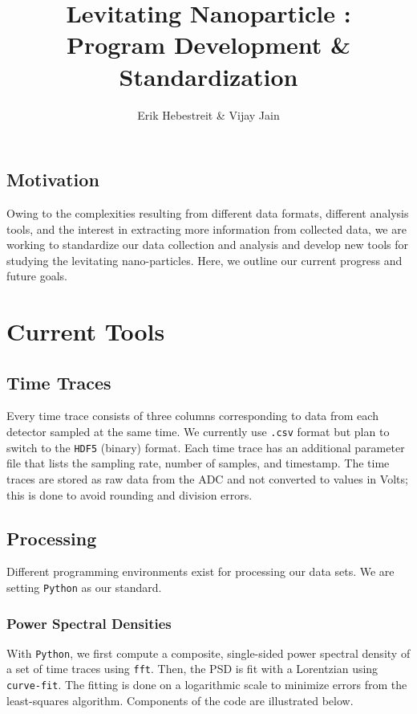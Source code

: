 \documentclass[a4paper,11pt,fleqn,english]{amsart}
\title{Levitating Nanoparticle : \\ Program Development \& Standardization}
\author{Erik Hebestreit \& Vijay Jain}
\begin{document}
\maketitle

\vspace{-0.75cm}

\subsection{{Motivation}} Owing to the complexities resulting from different data formats, different analysis tools, and the interest in extracting more information from collected data, we are working to standardize our data collection and analysis and develop new tools for studying the levitating nano-particles. Here, we outline our current progress and future goals.

\section{Current Tools}
\subsection{Time Traces} Every time trace consists of three columns corresponding to data from each detector sampled at the same time. We currently use \texttt{.csv} format but plan to switch to the \texttt{HDF5} (binary) format. Each time trace has an additional parameter file that lists the sampling rate, number of samples, and timestamp. The time traces are stored as raw data from the ADC and not converted to values in Volts; this is done to avoid rounding and division errors.

\subsection{Processing} Different programming environments exist for processing our data sets. We are setting \texttt{Python} as our standard.

\subsubsection{Power Spectral Densities} With \texttt{Python}, we first compute a composite, single-sided power spectral density of a set of time traces using \texttt{fft}. Then, the PSD is fit with a Lorentzian using \texttt{curve-fit}. The fitting is done on a logarithmic scale to minimize errors from the least-squares algorithm. Components of the code are illustrated below.
\end{document}
